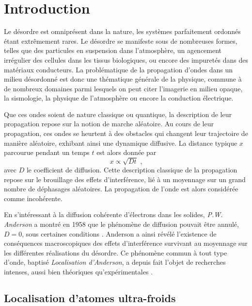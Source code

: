 {}

\chapter{Introduction}

Le désordre est omniprésent dans la nature, les systèmes parfaitement ordonnés étant extrêmement rares. Le désordre se manifeste sous de nombreuses formes, telles que des particules en suspension dans l'atmosphère, un agencement irrégulier des cellules dans les tissus biologiques, ou encore des impuretés dans des matériaux conducteurs. La problématique de la propagation d'ondes dans un milieu désordonné est donc une thématique générale de la physique, commune à de nombreux domaines parmi lesquels on peut citer l'imagerie en milieu opaque, la sismologie, la physique de l'atmosphère ou encore la conduction électrique. 

Que ces ondes soient de nature classique ou quantique, la description de leur propagation repose sur la notion de marche aléatoire. Au cours de leur propagation, ces ondes se heurtent à des obstacles qui changent leur trajectoire de manière aléatoire, exhibant ainsi une dynamique diffusive. La distance typique $x$ parcourue pendant un temps $t$ est alors donnée par
\begin{equation}
x\propto\sqrt{Dt} \text{ ,}
\end{equation}
avec $D$ le coefficient de diffusion. Cette description classique de la propagation repose sur le brouillage des effets d'interférence, lié à un moyennage sur un grand nombre de déphasages aléatoires. La propagation de l'onde est alors considérée comme incohérente.

En s'intéressant à la diffusion cohérente d'électrons dans les solides, \emph{P.W. Anderson} a montré en 1958 que le phénomène de diffusion pouvait être annulé, $D=0$, sous certaines conditions \citep{anderson1958absence}. Anderson a ainsi révélé l'existence de conséquences macroscopiques des effets d'interférence survivant au moyennage sur les différentes réalisations du désordre. Ce phénomène commun à tout type d'onde, baptisé \emph{Localisation d'Anderson}, a depuis fait l'objet de recherches intenses, aussi bien théoriques qu'expérimentales \citep{lagendijk2009fifty}. 


\section{Localisation d'atomes ultra-froids}

